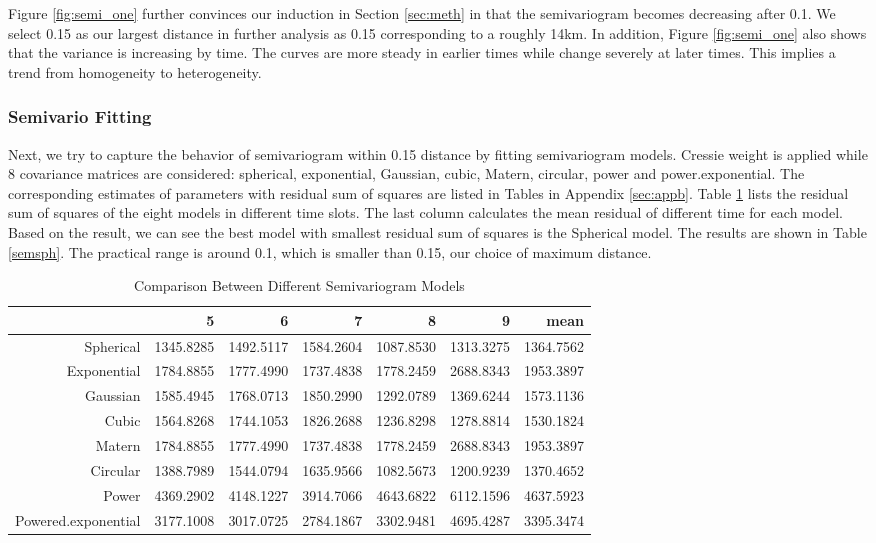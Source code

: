 \documentclass[hidelinks,12pt]{article}
\begin{document}
	Figure \ref{fig:semi_one} further convinces our induction in Section \ref{sec:meth} in that the semivariogram becomes decreasing after 0.1. We select 0.15 as our largest distance in further analysis as 0.15 corresponding to a roughly 14km. In addition, Figure \ref{fig:semi_one} also shows that the variance is increasing by time. The curves are more steady in earlier times while change severely at later times. This implies a trend from homogeneity to heterogeneity.
	
	\subsubsection{Semivario Fitting}
	Next, we try to capture the behavior of semivariogram within 0.15 distance by fitting semivariogram models. Cressie weight is applied while 8 covariance matrices are considered: spherical, exponential, Gaussian, cubic, Matern, circular, power and power.exponential. The corresponding estimates of parameters with residual sum of squares are listed in Tables in Appendix \ref{sec:appb}. Table \ref{tbl:compsem} lists the residual sum of squares of the eight models in different time slots. The last column calculates the mean residual of different time for each model. Based on the result, we can see the best model with smallest residual sum of squares is the Spherical model. The results are shown in Table \ref{semsph}. The practical range is around 0.1, which is smaller than 0.15, our choice of maximum distance.
	\begin{table}[ht]
		\centering
		\caption{Comparison Between Different Semivariogram Models \label{tbl:compsem}}
		\begin{tabular}{rrrrrrr}
			\hline
			& 5 & 6 & 7 & 8 & 9 & mean \\ 
			\hline
			Spherical & 1345.8285 & 1492.5117 & 1584.2604 & 1087.8530 & 1313.3275 & 1364.7562 \\ 
			Exponential & 1784.8855 & 1777.4990 & 1737.4838 & 1778.2459 & 2688.8343 & 1953.3897 \\ 
			Gaussian & 1585.4945 & 1768.0713 & 1850.2990 & 1292.0789 & 1369.6244 & 1573.1136 \\ 
			Cubic & 1564.8268 & 1744.1053 & 1826.2688 & 1236.8298 & 1278.8814 & 1530.1824 \\ 
			Matern & 1784.8855 & 1777.4990 & 1737.4838 & 1778.2459 & 2688.8343 & 1953.3897 \\ 
			Circular & 1388.7989 & 1544.0794 & 1635.9566 & 1082.5673 & 1200.9239 & 1370.4652 \\ 
			Power & 4369.2902 & 4148.1227 & 3914.7066 & 4643.6822 & 6112.1596 & 4637.5923 \\ 
			Powered.exponential & 3177.1008 & 3017.0725 & 2784.1867 & 3302.9481 & 4695.4287 & 3395.3474 \\ 
			\hline
		\end{tabular}
	\end{table}
\end{document}
